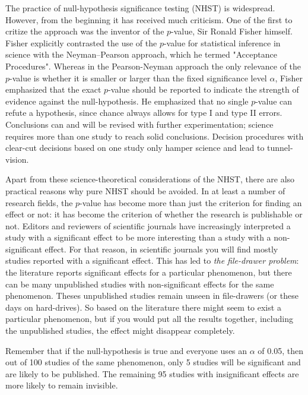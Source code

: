 \documentclass[]{report}\usepackage[]{graphicx}\usepackage[]{color}
\begin{document}
The practice of null-hypothesis significance testing (NHST) is widespread. However, from the beginning it has received much criticism. One of the first to critize the approach was the inventor of the $p$-value, Sir Ronald Fisher himself. Fisher explicitly contrasted the use of the $p$-value for statistical inference in science with the Neyman–Pearson approach, which he termed "Acceptance Procedures". Whereas in the Pearson-Neyman approach the only relevance of the $p$-value is whether it is smaller or larger than the fixed significance level $\alpha$, Fisher emphasized that the exact $p$-value should be reported to indicate the strength of evidence against the null-hypothesis. He emphasized that no single $p$-value can refute a hypothesis, since chance always allows for type I and type II errors. Conclusions can and will be revised with further experimentation; science requires more than one study to reach solid conclusions. Decision procedures with clear-cut decisions based on one study only hamper science and lead to tunnel-vision.

Apart from these science-theoretical considerations of the NHST, there are also practical reasons why pure NHST should be avoided. In at least a number of research fields, the $p$-value has become more than just the criterion for finding an effect or not: it has become the criterion of whether the research is publishable or not. Editors and reviewers of scientific journals have increasingly interpreted a study with a significant effect to be more interesting than a study with a non-significant effect. For that reason, in scientific journals you will find mostly studies reported with a significant effect. This has led to \textit{the file-drawer problem}: the literature reports significant effects for a particular phenomenon, but there can be many unpublished studies with non-significant effects for the same phenomenon. Theses unpublished studies remain unseen in file-drawers (or these days on hard-drives). So based on the literature there might seem to exist a particular phenomenon, but if you would put all the results together, including the unpublished studies, the effect might disappear completely.

Remember that if the null-hypothesis is true and everyone uses an $\alpha$ of 0.05, then out of 100 studies of the same phenomenon, only 5 studies will be significant and are likely to be published. The remaining 95 studies with insignificant effects are more likely to remain invisible. 
\end{document}

